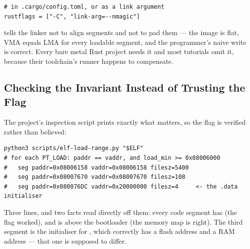 \begin{verbatim}
# in .cargo/config.toml, or as a link argument
rustflags = ["-C", "link-arg=--nmagic"]
\end{verbatim}

 tells the linker not to align segments and not to pad them — the image is flat,
VMA equals LMA for every loadable segment, and the programmer's naive write is correct. Every bare
metal Rust project needs it and most tutorials omit it, because their toolchain's runner happens to
compensate.

\subsection{Checking the Invariant Instead of Trusting the Flag}

The project's inspection script prints exactly what matters, so the flag is verified rather than
believed:

\begin{verbatim}
python3 scripts/elf-load-range.py "$ELF"
# for each PT_LOAD: paddr == vaddr, and load_min >= 0x08006000
#   seg paddr=0x08006158 vaddr=0x08006158 filesz=5400
#   seg paddr=0x08007670 vaddr=0x08007670 filesz=108
#   seg paddr=0x080076DC vaddr=0x20000000 filesz=4     <- the .data initialiser
\end{verbatim}

Three lines, and two facts read directly off them: every code segment has 
(the flag worked), and  is above the bootloader (the memory map is right). The
third segment is the initialiser for , which correctly has a flash address and a RAM
address — that one is supposed to differ.
